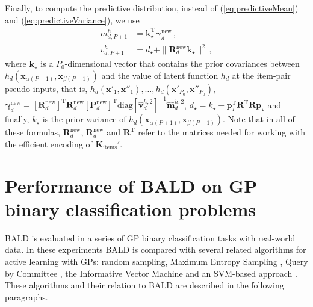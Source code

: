\documentclass{article}
\begin{document}
Finally, to compute the predictive distribution, instead of (\ref{eq:predictiveMean}) and (\ref{eq:predictiveVariance}), we use
\begin{align}
m_{d,P+1}^h & = \mathbf{k}_\star^\text{T} \bm \gamma^\text{new}_d\,,\\
v_{d,P+1}^h & = d_\star + \parallel \mathbf{R}^\text{new}_d \mathbf{k}_\star \parallel^2\,,
\end{align}
where $\mathbf{k}_\star$ is a $P_0$-dimensional vector that contains the prior covariances
between $h_d(\mathbf{x}_{\alpha(P+1)}, \mathbf{x}_{\beta(P+1)})$
and the value of latent function $h_d$ at the item-pair pseudo-inputs, that is,
$h_d(\mathbf{x}'_{1}, \mathbf{x}''_{1}),\ldots,h_d(\mathbf{x}'_{P_0}, \mathbf{x}''_{P_0})$,
$\bm \gamma^\text{new}_d = [\mathbf{R}^\text{new}_d]^\text{T} \mathbf{R}_d^\text{new}
[\mathbf{P}_d^\text{new}]^\text{T} \text{diag}[\hat{\mathbf{v}}_d^{h,2}]^{-1}\hat{\mathbf{m}}_d^{h,2}$,
$d_\star = k_\star - \mathbf{p}_\star^\text{T} \mathbf{R}^\text{T} \mathbf{R} \mathbf{p}_\star$ and 
finally, $k_\star$ is the prior variance of $h_d(\mathbf{x}_{\alpha(P+1)}, \mathbf{x}_{\beta(P+1)})$.
Note that in all of these formulas, $\mathbf{R}_d^\text{new}$, $\mathbf{R}_d^\text{new}$ and $\mathbf{R}^\text{T}$ 
refer to the matrices needed for working with the efficient encoding of $\mathbf{K}_\text{items}'$.

\section{Performance of BALD on GP binary classification problems}

BALD is evaluated in a series of GP binary classification tasks with real-world data.
In these experiments BALD is compared with several related algorithms
for active learning with GPs: random sampling, Maximum Entropy Sampling \cite{sebastiani2000}, Query by Committee \cite{freund1997}, 
the Informative Vector Machine \cite{lawrence2002} and an SVM-based approach \cite{tong2001}. 
These algorithms and their relation to BALD are described in the following paragraphs.
\end{document}
